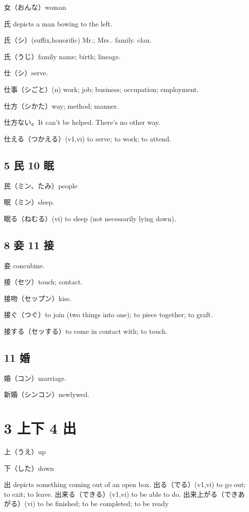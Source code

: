 女（おんな）woman

氏 depicts a man bowing to the left.

氏（シ）(suffix,honorific) Mr.; Mrs.. family. clan.

氏（うじ）family name; birth; lineage.

仕（シ）serve.

仕事（シごと）(n) work; job; business; occupation; employment.

仕方（シかた）way; method; manner.

仕方ない。It can't be helped. There's no other way.

仕える（つかえる）(v1,vi) to serve; to work; to attend.

\subsection{5 民 10 眠}

民（ミン、たみ）people

眠（ミン）sleep.

眠る（ねむる）(vi) to sleep (not necessarily lying down).

\subsection{8 妾 11 接}

妾 concubine.

接（セツ）touch; contact.

接吻（セップン）kiss.

接ぐ（つぐ）to join (two things into one); to piece together; to graft.

接する（セッする）to come in contact with; to touch.

\subsection{11 婚}

婚（コン）marriage.

新婚（シンコン）newlywed.

\section{3 上下 4 出}

上（うえ）up

下（した）down

出 depicts something coming out of an open box.
出る（でる）(v1,vi) to go out; to exit; to leave.
出来る（できる）(v1,vi) to be able to do.
出来上がる（できあがる）(vi) to be finished; to be completed; to be ready

